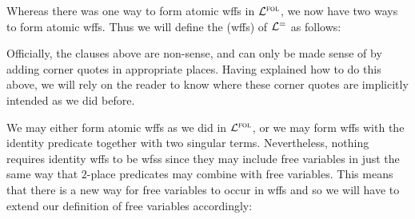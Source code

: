 Whereas there was one way to form atomic wffs in $\mathcal{L}^{\textsc{fol}}$, we now have two ways to form atomic wffs.
Thus we will define the  (wffs) of $\mathcal{L}^{=}$ as follows:


Officially, the clauses above are non-sense, and can only be made sense of by adding corner quotes in appropriate places.
Having explained how to do this above, we will rely on the reader to know where these corner quotes are implicitly intended as we did before.

We may either form atomic wffs as we did in $\mathcal{L}^{\textsc{fol}}$, or we may form wffs with the identity predicate together with two singular terms.
Nevertheless, nothing requires identity wffs to be wfss since they may include free variables in just the same way that $2$-place predicates may combine with free variables.
This means that there is a new way for free variables to occur in wffs and so we will have to extend our definition of free variables accordingly:

